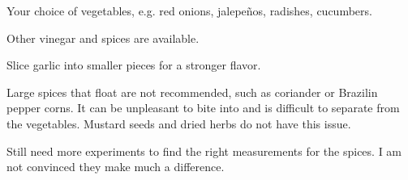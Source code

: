 \begin{variation}
\item Your choice of vegetables, e.g. red onions, jalepe\~{n}os, radishes, cucumbers.

\item Other vinegar and spices are available.

\item Slice garlic into smaller pieces for a stronger flavor.
\end{variation}


\begin{experiments}
\item Large spices that float are not recommended, such as coriander or Brazilin pepper corns.
	It can be unpleasant to bite into and is difficult to separate from the vegetables.
	Mustard seeds and dried herbs do not have this issue.
\item Still need more experiments to find the right measurements for the spices.
	I am not convinced they make much a difference.
\end{experiments}

\recipeend%
